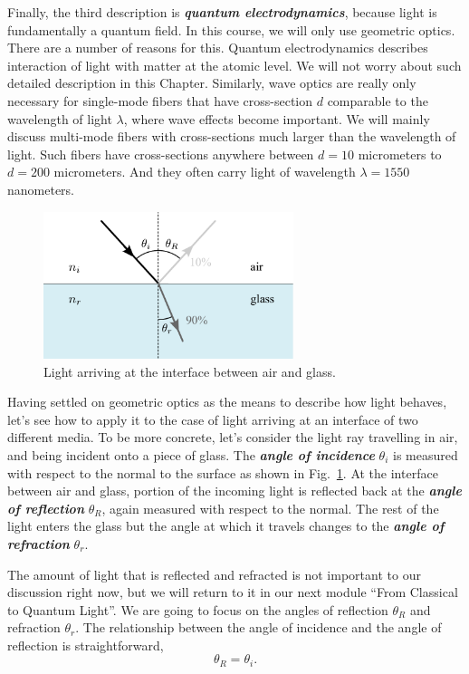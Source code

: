 Finally, the third description is \textit{\textbf{quantum electrodynamics}}, because light is fundamentally a quantum field.
In this course, we will only use geometric optics.
There are a number of reasons for this.
Quantum electrodynamics describes interaction of light with matter at the atomic level.
We will not worry about such detailed description in this Chapter.
Similarly, wave optics are really only necessary for single-mode fibers that have cross-section $d$ comparable to the wavelength of light $\lambda$, where wave effects become important.
We will mainly discuss multi-mode fibers with cross-sections much larger than the wavelength of light.
Such fibers have cross-sections anywhere between $d=10$ micrometers to $d=200$ micrometers.
And they often carry light of wavelength $\lambda=1550$ nanometers.

\begin{figure}[t]
    \centering
    \includegraphics[width=0.65\textwidth]{lesson7/7-2_light-interface.pdf}
    \caption[Angle of incidence]{Light arriving at the interface between air and glass.}
    \label{fig:7-2_interface}
\end{figure}

Having settled on geometric optics as the means to describe how light behaves, let's see how to apply it to the case of light arriving at an interface of two different media.
To be more concrete, let's consider the light ray travelling in air, and being incident onto a piece of glass.
The \textit{\textbf{angle of incidence}} $\theta_i$ is measured with respect to the normal to the surface as shown in Fig.~\ref{fig:7-2_interface}.
At the interface between air and glass, portion of the incoming light is reflected back at the \textit{\textbf{angle of reflection}} $\theta_R$, again measured with respect to the normal.
The rest of the light enters the glass but the angle at which it travels changes to the \textit{\textbf{angle of refraction}} $\theta_r$.

The amount of light that is reflected and refracted is not important to our discussion right now, but we will return to it in our next module ``From Classical to Quantum Light''.
We are going to focus on the angles of reflection $\theta_R$ and refraction $\theta_r$.
The relationship between the angle of incidence and the angle of reflection is straightforward,
\begin{equation}
    \theta_R = \theta_i.
\end{equation}

